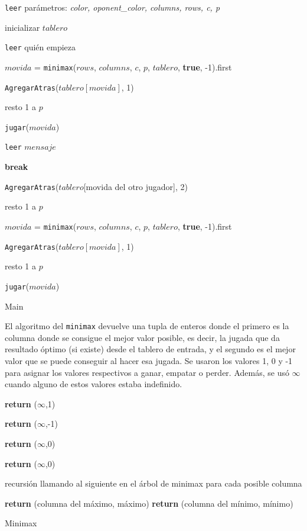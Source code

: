 \documentclass[A4paper,oneside,fleqn,11pt]{article}
\theoremstyle{definition}
\begin{document}
\begin{algorithm}
	\texttt{leer} parámetros: \textit{color, oponent\_color, columns, rows, c, p}
	
    inicializar $tablero$

	\texttt{leer} quién empieza

		{
		$movida$ = \texttt{minimax}($rows$, $columns$, $c$, $p$, $tablero$, \textbf{true}, -1).first

		\texttt{AgregarAtras}($tablero[movida]$, 1)

		resto 1 a $p$

		\texttt{jugar}($movida$)		
		}

    	{
    	\texttt{leer} $mensaje$

        	{
        	\textbf{break}
            }

        \texttt{AgregarAtras}($tablero$[movida del otro jugador], 2)        	

		resto 1 a $p$

        $movida$ = \texttt{minimax}($rows$, $columns$, $c$, $p$, $tablero$, \textbf{true}, -1).first

        \texttt{AgregarAtras}($tablero[movida]$, 1)

        resto 1 a $p$

    	\texttt{jugar}($movida$)
    	}
    \caption{Main}   
\end{algorithm}

El algoritmo del \texttt{minimax} devuelve una tupla de enteros donde el primero es la columna donde se consigue el mejor valor posible, es decir, la jugada  que da resultado óptimo (si existe) desde el tablero de entrada, y el segundo es el mejor valor que se puede conseguir al hacer esa jugada. Se usaron los valores 1, 0 y -1 para asignar los valores respectivos a ganar, empatar o perder. Además, se usó $\infty$ cuando alguno de estos valores estaba indefinido.


\begin{algorithm}


    
			{
			\textbf{return} ($\infty$,1)
			}

			{
			\textbf{return} ($\infty$,-1)
			}

			{
			\textbf{return} ($\infty$,0)
			}

			{
		    \textbf{return} ($\infty$,0)
		    }
		
		recursión llamando al siguiente en el árbol de minimax para cada posible columna
		
			{
		    \textbf{return} (columna del máximo, máximo)
			}
			{
		    \textbf{return} (columna del mínimo, mínimo)
			}

\caption{Minimax}
\end{algorithm}
\end{document}
